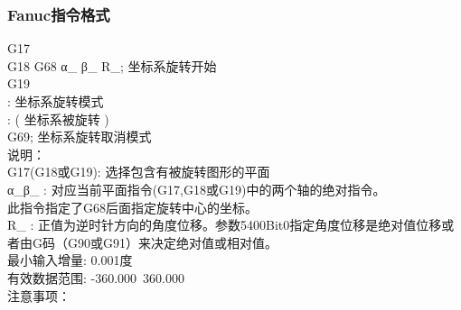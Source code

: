 \subsubsection{Fanuc指令格式}
G17\\
G18 G68 α\_ β\_ R\_; 坐标系旋转开始\\
G19\\
:                  坐标系旋转模式 \\
:                  ( 坐标系被旋转 )\\
G69;                坐标系旋转取消模式\\
说明：\\
G17(G18或G19): 选择包含有被旋转图形的平面\\
α\_β\_ :         对应当前平面指令(G17,G18或G19)中的两个轴的绝对指令。\\
此指令指定了G68后面指定旋转中心的坐标。\\
R\_    :         正值为逆时针方向的角度位移。参数5400Bit0指定角度位移是绝对值位移或者由G码（G90或G91）来决定绝对值或相对值。\\
最小输入增量: 0.001度\\
有效数据范围: -360.000~360.000\\
注意事项：
